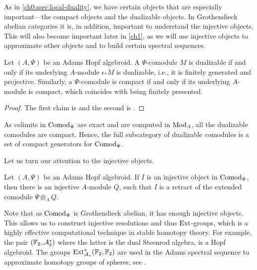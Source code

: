As in \cref{ch0:ssec:local-duality}, we have certain objects that are especially important---the compact objects and the dualizable objects. In Grothendieck abelian categories it is, in addition, important to understand the injective objects. This will also become important later in \cref{ch1}, as we will use injective objects to approximate other objects and to build certain spectral sequences.  

\begin{proposition}
    \label{ch0:rm:dualizable/compact-comodules}
    Let $(A, \Psi)$ be an Adams Hopf algebroid. A $\Psi$-comodule $M$ is dualizable if and only if its underlying $A$-module $\epsilon_* M$ is dualizable, i.e., it is finitely generated and projective. Similarly, a $\Psi$-comodule is compact if and only if its underlying $A$-module is compact, which coincides with being finitely presented. 
\end{proposition}
\begin{proof}
    The first claim is \cite[1.3.4]{hovey_04} and the second is \cite[1.4.2]{hovey_04}. 
\end{proof}

\begin{remark}
    \label{ch0:rm:dualizables-compact-generators}
    As colimits in $\mathrm{Comod}_\Psi$ are exact and are computed in $\mathrm{Mod}_A$, all the dualizable comodules are compact. Hence, the full subcategory of dualizable comodules is a set of compact generators for $\mathrm{Comod}_\Psi$. 
\end{remark}

Let us turn our attention to the injective objects. 

\begin{proposition}
    \label{ch0:rm:injective-comodules}
    Let $(A, \Psi)$ be an Adams Hopf algebroid. If $I$ is an injective object in $\mathrm{Comod}_\Psi$, then there is an injective $A$-module $Q$, such that $I$ is a retract of the extended comodule $\Psi\otimes_A Q$. 
\end{proposition}

\begin{remark}
    Note that as $\mathrm{Comod}_{\Psi}$ is Grothendieck abelian, it has enough injective objects. This allows us to construct injective resolutions and thus $\operatorname{Ext}$-groups, which is a highly effective computational technique in stable homotopy theory. For example, the pair $(\mathbb{F}_2, \mathcal{A}_2^*)$ where the latter is the dual Steenrod algebra, is a Hopf algebroid. The groups $\operatorname{Ext}^s_{\mathcal{A}_*}(\mathbb{F}_2, \mathbb{F}_2)$ are used in the Adams spectral sequence to approximate homotopy groups of spheres, see \cite{adams_58}. 
\end{remark}

